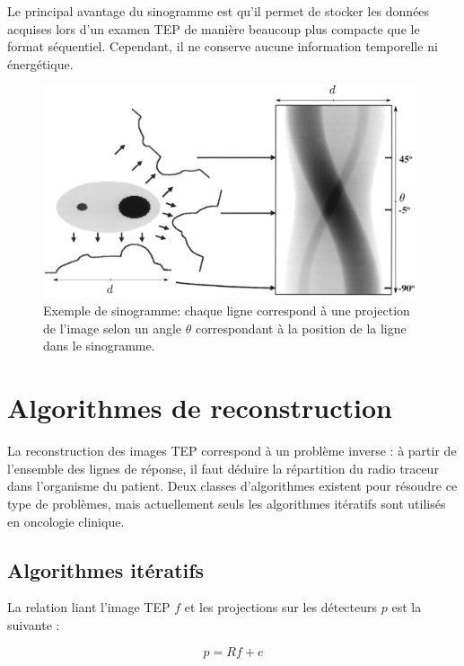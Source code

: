 Le principal avantage du sinogramme est qu'il permet de stocker les données acquises lors d'un examen TEP de manière beaucoup plus compacte que le format séquentiel. Cependant, il ne conserve aucune information temporelle ni énergétique.

\begin{figure}
\centering
\includegraphics[width=11cm]{images/sino}
\caption[Principe du sinogramme]{Exemple de sinogramme: chaque ligne correspond à une projection de l'image selon un angle $\theta$ correspondant à la position de la ligne dans le sinogramme.}
\label{fig:sino}
\end{figure}











\chapter{Algorithmes de reconstruction}

La reconstruction des images TEP correspond à un problème inverse : à partir de l'ensemble des lignes de réponse, il faut déduire la répartition du radio traceur dans l'organisme du patient. Deux classes d'algorithmes existent pour résoudre ce type de problèmes, mais actuellement seuls les algorithmes itératifs sont utilisés en oncologie clinique. 

	\section{Algorithmes itératifs}

La relation liant l'image TEP $f$ et les projections sur les détecteurs $p$ est la suivante :

\begin{equation}
	p = R f + e
\label{eq:eqTEP}
\end{equation}

